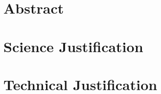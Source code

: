 \documentclass[12pt]{article}
\begin{document}
\section*{Abstract}


\clearpage
\thispagestyle{empty}

\section*{Science Justification}


\clearpage

\thispagestyle{empty}

\section*{Technical Justification}

\end{document}
